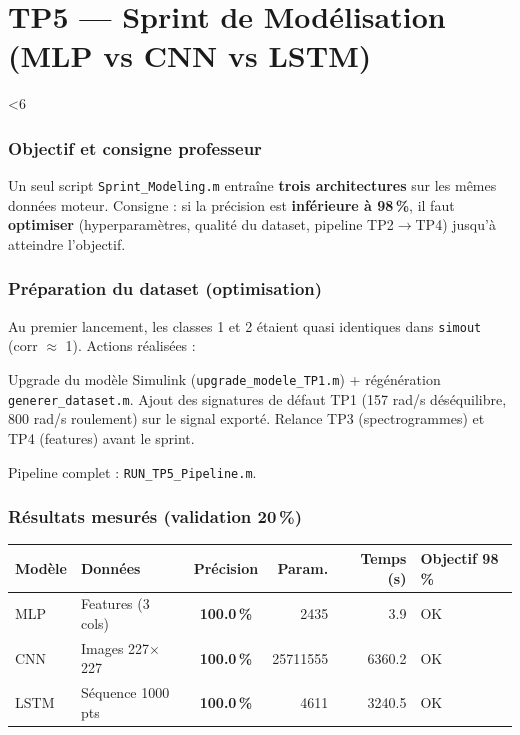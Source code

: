 ﻿\documentclass[11pt,a4paper]{article}
\newcommand{\setfigw}[1]{%
  \ifnum#1<6
    \def\figw{1.0\linewidth}%
  \else
    \def\figw{0.8\linewidth}%
  \fi
}
\begin{document}
\part{TP5 — Sprint de Modélisation (MLP vs CNN vs LSTM)}
\setfigw{4}

\section{Objectif et consigne professeur}
Un seul script \texttt{Sprint\_Modeling.m} entraîne \textbf{trois architectures} sur les mêmes données moteur. Consigne : si la précision est \textbf{inférieure à 98\,\%}, il faut \textbf{optimiser} (hyperparamètres, qualité du dataset, pipeline TP2$\rightarrow$TP4) jusqu'à atteindre l'objectif.

\section{Préparation du dataset (optimisation)}
Au premier lancement, les classes 1 et 2 étaient quasi identiques dans \texttt{simout} (corr $\approx$ 1). Actions réalisées :
\begin{itemize}
  Upgrade du modèle Simulink (\texttt{upgrade\_modele\_TP1.m}) + régénération \texttt{generer\_dataset.m}.
  Ajout des signatures de défaut TP1 (157 rad/s déséquilibre, 800 rad/s roulement) sur le signal exporté.
   Relance TP3 (spectrogrammes) et TP4 (features) avant le sprint.
\end{itemize}
Pipeline complet : \texttt{RUN\_TP5\_Pipeline.m}.

\section{Résultats mesurés (validation 20\,\%)}
\begin{center}
\begin{tabular}{|l|l|c|r|r|l|}
\hline
\textbf{Modèle} & \textbf{Données} & \textbf{Précision} & \textbf{Param.} & \textbf{Temps (s)} & \textbf{Objectif 98\,\%} \\
\hline
MLP & Features (3 cols) & \textbf{100.0\,\%} & 2435 & 3.9 & OK \\
CNN & Images 227$\times$227 & \textbf{100.0\,\%} & 25711555 & 6360.2 & OK \\
LSTM & S\'equence 1000 pts & \textbf{100.0\,\%} & 4611 & 3240.5 & OK \\
\hline
\end{tabular}
\end{center}
\end{document}
